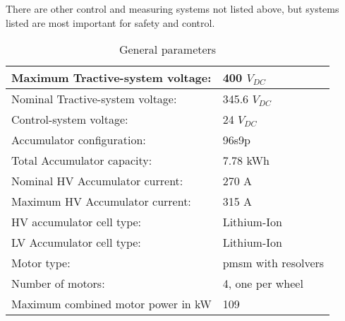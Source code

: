 There are other control and measuring systems not listed above, but systems listed are most important for safety and control.


\begin{table}[H]
	\centering
	\caption{General parameters}
	\begin{tabu}{|X|X|}
		\hline
		Maximum Tractive-system voltage: & 400 $V_{DC}$  \\
		\hline Nominal Tractive-system voltage: & 345.6 $V_{DC}$\\
		\hline
		Control-system voltage: & 24 $V_{DC}$ \\
		\hline
		Accumulator configuration: & 96s9p \\
		\hline
		Total Accumulator capacity: & 7.78 kWh\\
		\hline
		Nominal HV Accumulator current: & 270 A \\
		\hline
		Maximum HV Accumulator current: & 315 A \\
		\hline
		HV accumulator cell type: & Lithium-Ion  \\
		\hline
		LV Accumulator cell type: & Lithium-Ion \\
		\hline
		Motor type: & \gls{pmsm} with resolvers \\
		\hline
		Number of motors: &  4, one per wheel \\
		\hline
		Maximum combined motor power in kW & 109 \\
		\hline
	\end{tabu}%
	\label{tab:system-general}%
\end{table}%
